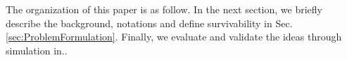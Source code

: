 

The organization of this paper is as follow. In the next section, we briefly describe the background, notations and define survivability in Sec.\ref{sec:ProblemFormulation}. Finally, we evaluate and validate the ideas through simulation in..
